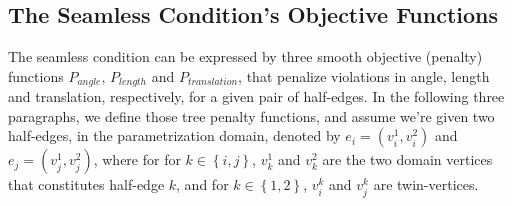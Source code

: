 \subsection{The Seamless Condition's Objective Functions}
The seamless condition can be expressed by three smooth objective (penalty) functions $P_{angle}$, $P_{length}$ and $P_{translation}$, that penalize violations in angle, length and translation, respectively, for a given pair of half-edges. In the following three paragraphs, we define those tree penalty functions, and assume we're given two half-edges, in the parametrization domain, denoted by $e_i = \left(v_i^1,v_i^2\right)$ and $e_j = \left(v_j^1,v_j^2\right)$, where for for $k \in \left\{i,j\right\}$, $v_k^1$ and $v_k^2$ are the two domain vertices that constitutes half-edge $k$, and for $k \in \left\{1,2\right\}$, $v_i^k$ and $v_j^k$ are twin-vertices.
